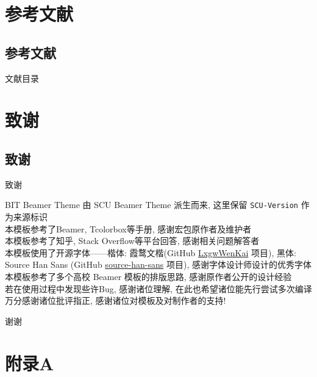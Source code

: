 \documentclass[hyperref, UTF8, CJK, aspectratio=169]{beamer}
\begin{document}
\section{参考文献}
\subsection{参考文献}
\begin{frame}[allowframebreaks]{文献目录}
	\nocite{*}
	\printbibliography[heading=none]
\end{frame}

\section{致谢}
\subsection{致谢}
\begin{frame}{致谢}
	\begin{center}
		BIT Beamer Theme 由 SCU Beamer Theme 派生而来, 这里保留 \texttt{SCU-Version} 作为来源标识\\[1ex]
		本模板参考了Beamer, Tcolorbox等手册, 感谢宏包原作者及维护者\\[1ex]
		本模板参考了知乎, Stack Overflow等平台回答, 感谢相关问题解答者\\[1ex]
			本模板使用了开源字体——楷体: 霞鹜文楷(GitHub \href{https://github.com/lxgw/LxgwWenKai/}{\color{bitb}LxgwWenKai} 项目), 黑体: Source Han Sans (GitHub \href{https://github.com/adobe-fonts/source-han-sans/}{\color{bitb}source-han-sans} 项目), 感谢字体设计师设计的优秀字体\\[1ex]
		本模板参考了多个高校 Beamer 模板的排版思路, 感谢原作者公开的设计经验\\[1ex]
		
		若在使用过程中发现些许Bug, 感谢诸位理解, 在此也希望诸位能先行尝试多次编译\\[1ex]
		万分感谢诸位批评指正, 感谢诸位对模板及对制作者的支持!
	\end{center}
\end{frame}

\begin{frame}{}
	\centering
	\Huge 谢谢
\end{frame}

\appendix
\section{附录A}
\end{document}
